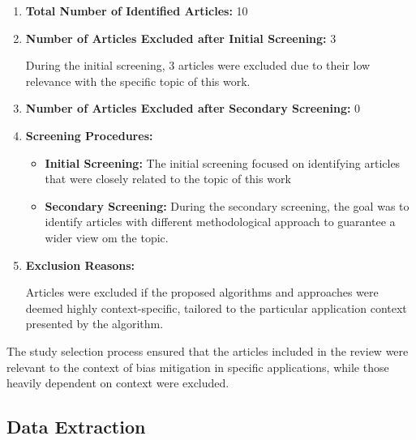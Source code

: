 \documentclass{article}
\begin{document}
\begin{enumerate}

    \item \textbf{Total Number of Identified Articles:} 10

    \item \textbf{Number of Articles Excluded after Initial Screening:} 3

    During the initial screening, 3 articles were excluded due to their low relevance with the specific topic of this work.
        
    \item \textbf{Number of Articles Excluded after Secondary Screening:} 0
        
    \item \textbf{Screening Procedures:}
        
    \begin{itemize}
    
        \item \textbf{Initial Screening:} The initial screening focused on identifying articles that were closely related to the topic of this work
            
    
        \item \textbf{Secondary Screening:} During the secondary screening, the goal was to identify articles with different methodological approach to guarantee a wider view om the topic.
    
    \end{itemize}
        
    
    \item \textbf{Exclusion Reasons:}
    
    Articles were excluded if the proposed algorithms and approaches were deemed highly context-specific, tailored to the particular application context presented by the algorithm.
    
    \end{enumerate}
    
    The study selection process ensured that the articles included in the review were relevant to the context of bias mitigation in specific applications, while those heavily dependent on context were excluded.
    
    \subsection{Data Extraction}
    
\end{document}
